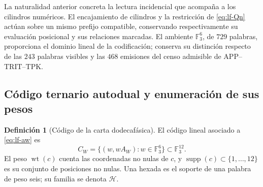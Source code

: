 \documentclass[a4paper,10pt]{article}
\theoremstyle{definition}\newtheorem{definition}[theorem]{Definición}
\theoremstyle{remark}\newtheorem{remark}[theorem]{Observación}
\numberwithin{equation}{section}
\begin{document}
La naturalidad anterior concreta la lectura incidencial que
acompaña a los cilindros numéricos. El encajamiento de cilindros
y la restricción de \eqref{eq:lf-Qn} actúan sobre un mismo
prefijo compatible, conservando respectivamente su evaluación
posicional y sus relaciones marcadas. El ambiente
\(\mathbb F_3^6\), de \(729\) palabras, proporciona el dominio
lineal de la codificación; conserva su distinción respecto de
las \(243\) palabras visibles y las \(468\) emisiones del censo
admisible de APP--TRIT--TPK.

\subsection{Código ternario autodual y enumeración de sus pesos}
\label{subsec:lf-code}

\begin{definition}[Código de la carta dodecafásica]
El código lineal asociado a \eqref{eq:lf-aw} es
\[
 C_W=\{(w,wA_W):w\in\mathbb F_3^6\}\subset\mathbb F_3^{12}.
\]
El peso \(\operatorname{wt}(c)\) cuenta las coordenadas no nulas
de \(c\), y \(\operatorname{supp}(c)\subset\{1,\ldots,12\}\)
es su conjunto de posiciones no nulas. Una hexada es el soporte
de una palabra de peso seis; su familia se denota \(\mathcal H\).
\end{definition}
\end{document}
